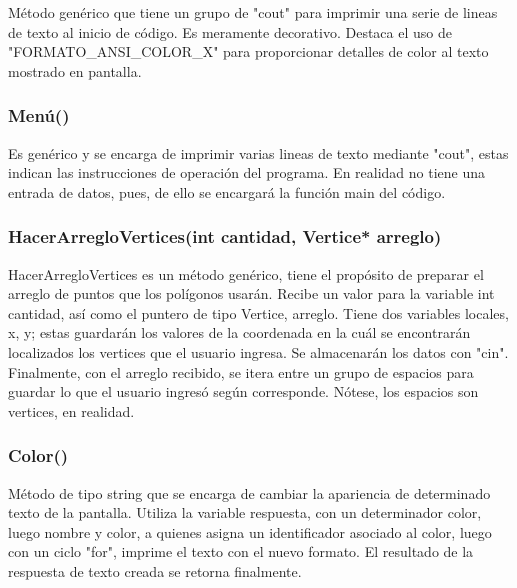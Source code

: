 \documentclass[11pt]{article}
\begin{document}
	Método genérico que tiene un grupo de "cout" para imprimir una serie de lineas de texto al inicio de código. Es meramente decorativo. Destaca el uso de "FORMATO\_ANSI\_COLOR\_X" para proporcionar detalles de color al texto mostrado en pantalla.

\subsubsection{Menú()}

	Es genérico y se encarga de imprimir varias lineas de texto mediante "cout", estas indican las instrucciones de operación del programa. En realidad no tiene una entrada de datos, pues, de ello se encargará la función 
main del código.

\subsubsection{HacerArregloVertices(int cantidad, Vertice* arreglo)}

	HacerArregloVertices es un método genérico, tiene el propósito de preparar el arreglo de puntos que los polígonos usarán. Recibe un valor para la variable int cantidad, así como el puntero de tipo Vertice, arreglo.
	Tiene dos variables locales, x, y; estas guardarán los valores de la coordenada en la cuál se encontrarán localizados los vertices que el usuario ingresa. Se almacenarán los datos con "cin". Finalmente, con el arreglo recibido, se itera entre un grupo de espacios para guardar lo que el usuario ingresó según corresponde. Nótese, los espacios son vertices, en realidad.

\subsubsection{Color()}
	
	Método de tipo string que se encarga de cambiar la apariencia de determinado texto de la pantalla. Utiliza la variable respuesta, con un determinador color, luego nombre y color, a quienes asigna un identificador asociado al color, luego con un ciclo "for", imprime el texto con el nuevo formato.
	El resultado de la respuesta de texto creada se retorna finalmente.
\end{document}
